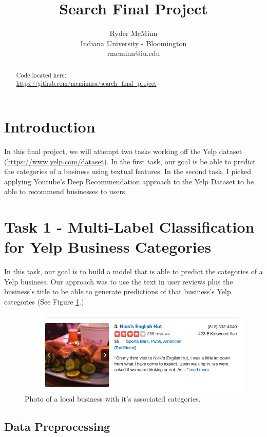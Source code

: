 \documentclass{article}
\title{Search Final Project}
\author{
Ryder McMinn\\
\affiliations
Indiana University - Bloomington\\
\emails
rmcminn@iu.edu
}
\begin{document}
\maketitle

\begin{abstract}
	Code located here:\\ \url{https://github.com/mcminnra/search_final_project}
\end{abstract}

\section*{Introduction}

In this final project, we will attempt two tasks working off the Yelp dataset (\url{https://www.yelp.com/dataset}). In the first task, our goal is be able to predict the categories of a business using textual features. In the second task, I picked applying Youtube's Deep Recommendation approach \cite{youtubedeep} to the Yelp Dataset to be able to recommend businesses to users.

\section*{Task 1 - Multi-Label Classification for Yelp Business Categories}

In this task, our goal is to build a model that is able to predict the categories of a Yelp business. Our approach was to use the text in user reviews plus the business's title to be able to generate predictions of that business's Yelp categories (See Figure \ref{fig:yelp_categories}.)

\begin{figure}[h!]
	\includegraphics[width=\linewidth]{img/yelp_categories.png}
	\caption{Photo of a local business with it's associated categories.}
	\label{fig:yelp_categories}
\end{figure}

\subsection*{Data Preprocessing}
\end{document}
